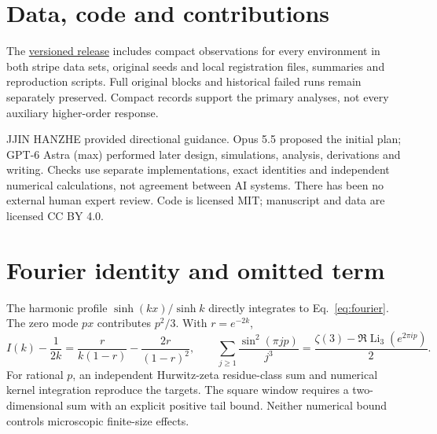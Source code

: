 \documentclass[11pt,a4paper]{article}
\newcommand{\Li}{\operatorname{Li}}
\begin{document}
\section*{Data, code and contributions}
The \href{https://github.com/SHIN09-git/mirror3d-partial-ports/releases/tag/v1.0.0}{versioned release} includes compact observations for every
environment in both stripe data sets, original seeds and local registration
files, summaries and reproduction scripts. Full original blocks and historical
failed runs remain separately preserved. Compact records support the primary
analyses, not every auxiliary higher-order response.

JJIN HANZHE provided directional guidance. Opus 5.5 proposed the initial plan;
GPT-6 Astra (max) performed later design, simulations, analysis, derivations
and writing. Checks use separate implementations, exact identities and
independent numerical calculations, not agreement between AI systems.
There has been no external human expert review.
Code is licensed MIT; manuscript and data are licensed CC BY 4.0.

\appendix
\section{Fourier identity and omitted term}
The harmonic profile \(\sinh(kx)/\sinh k\) directly integrates to
Eq.~\eqref{eq:fourier}. The zero mode \(px\) contributes \(p^2/3\).
With \(r=e^{-2k}\),
\[
I(k)-\frac1{2k}=\frac{r}{k(1-r)}-\frac{2r}{(1-r)^2},\qquad
\sum_{j\ge1}\frac{\sin^2(\pi jp)}{j^3}
=\frac{\zeta(3)-\Re\Li_3(e^{2\pi ip})}{2}.
\]
For rational \(p\), an independent Hurwitz-zeta residue-class sum and
numerical kernel integration reproduce the targets. The square window
requires a two-dimensional sum with an explicit positive tail bound.
Neither numerical bound controls microscopic finite-size effects.


\end{document}
